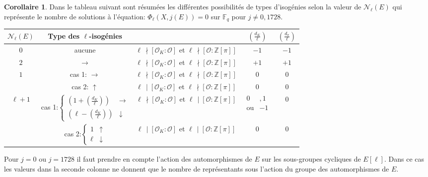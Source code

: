 \documentclass[10pt,a4paper]{book}
\theoremstyle{plain}
\theoremstyle{definition}
\theoremstyle{definition}
\theoremstyle{definition}
\newtheorem{cor}[thm]{Corollaire}
\theoremstyle{definition}
\theoremstyle{definition}
\theoremstyle{remark}
\theoremstyle{remark}
\theoremstyle{definition}
\begin{document}
\begin{cor}
\label{cor:tab:vol} 
Dans le tableau suivant sont résumées les différentes possibilités de types d'isogénies selon la valeur de $\mathcal{N}_{\ell}(E)$ qui représente le nombre de solutions à l'équation: $\Phi_{\ell}(X,j(E))=0$ sur $\mathbb{F}_q$ pour $j\neq 0, 1728$.
\newline
\begin{tabular}{|c|c|c|c|c|}
\hline 
$\mathcal{N}_{\ell}(E)$ & Type des $\ell$-isogénies &  & $\left(\frac{d_K}{\ell}\right)$ & $\left(\frac{d_{\pi}}{\ell}\right)$\tabularnewline
\hline 
\hline 
$0$ & aucune & $\ell \,\nmid[\mathcal{O}_{K}:\mathcal{O}]$ et $\ell \,\nmid[\mathcal{O}:\mathbb{Z}[\pi]]$  & $-1$ & $-1$\\
\hline 
$2$ & $\rightarrow$ & $\ell \,\nmid[\mathcal{O}_{K}:\mathcal{O}]$ et $\ell \,\nmid[\mathcal{O}:\mathbb{Z}[\pi]]$  & $+1$ & $+1$\\
\hline 
$1$ & cas 1: $\rightarrow$ & $\ell\,\nmid[\mathcal{O}_{K}:\mathcal{O}]$ et $\ell\,\nmid[\mathcal{O}:\mathbb{Z}[\pi]]$  & $0$ & $0$\\

\cline{2-5} & cas 2: $\uparrow$ & $\ell\,\mid[\mathcal{O}_{K}:\mathcal{O}]$ et $\ell\,\nmid[\mathcal{O}:\mathbb{Z}[\pi]]$  & $0$ & $0$\\
\hline 
$\ell+1$ & cas 1:$\left\{ \begin{array}{cc}
(1+\left(\frac{d_K}{\ell}\right))& \rightarrow\\
(\ell-\left(\frac{d_K}{\ell}\right)) & \downarrow
\end{array}\right.$ & $\ell \,\nmid[\mathcal{O}_{K}:\mathcal{O}]$ et $\ell \,\mid[\mathcal{O}:\mathbb{Z}[\pi]]$  & $\begin{alignedat}{1} 0 &, 1 \\ \text{ou} &-1 \end{alignedat}$ & $0$\\
 
\cline{2-5} & cas 2:$\left\{ \begin{array}{cc}
1 & \uparrow\\
\ell & \downarrow
\end{array}\right.$ & $\ell \,\mid[\mathcal{O}_{K}:\mathcal{O}]$ et $\ell \,\mid[\mathcal{O}:\mathbb{Z}[\pi]]$  & $0$ & $0$ \\
\hline 
\end{tabular}
Pour $j=0$ ou $j=1728$ il faut prendre en compte l'action des automorphismes de
$E$ sur les sous-groupes cycliques de $E[\ell]$. Dans ce cas
 les valeurs dans la seconde colonne ne donnent que le nombre 
de représentants sous l'action du groupe des automorphismes de $E$.
\end{cor}
\end{document}
